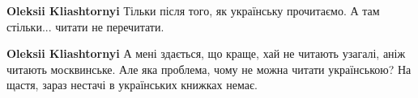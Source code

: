 \begin{itemize}
\textbf{Oleksii Kliashtornyi} Тільки після того, як українську прочитаємо. А там стільки... читати не перечитати.

 
\textbf{Oleksii Kliashtornyi} А мені здається, що краще, хай не читають узагалі, аніж читають москвинське. Але яка проблема, чому не можна читати українською? На щастя, зараз нестачі в українських книжках немає.




\end{itemize}
